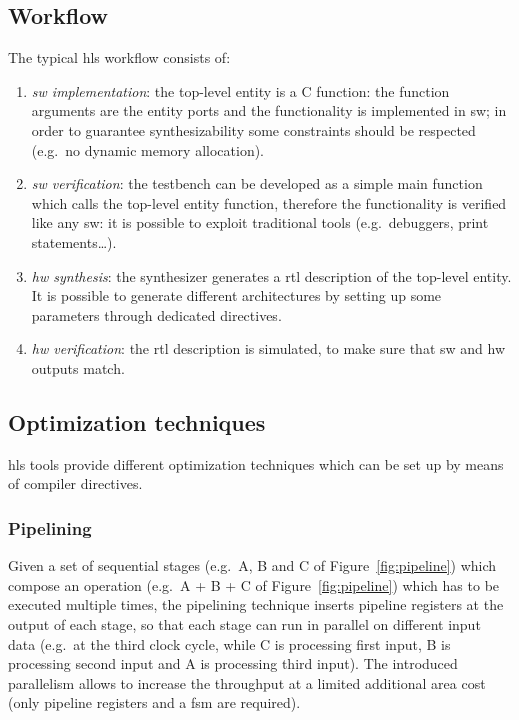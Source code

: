\documentclass[11pt,a4paper,oneside]{memoir}
\begin{document}
\subsection{Workflow}
The typical \ac{hls} workflow consists of:
\begin{enumerate}
	\item \emph{\ac{sw} implementation}: the top-level entity is a C
		function: the function arguments are the entity ports and the
		functionality is implemented in \ac{sw}; in order to guarantee
		synthesizability some constraints should be respected (e.g.\ no
		dynamic memory allocation).
	\item \emph{\ac{sw} verification}: the testbench can be developed as a
		simple main function which calls the top-level entity function,
		therefore the functionality is verified like any \ac{sw}: it is
		possible to exploit traditional tools (e.g.\ debuggers, print
		statements\ldots).
	\item \emph{\ac{hw} synthesis}: the synthesizer generates a \ac{rtl}
		description of the top-level entity. It is possible to generate
		different architectures by setting up some parameters through
		dedicated directives.
	\item \emph{\ac{hw} verification}: the \ac{rtl} description is
		simulated, to make sure that \ac{sw} and \ac{hw} outputs match.
\end{enumerate}

\subsection{Optimization techniques}
\ac{hls} tools provide different optimization techniques which can be set up by
means of compiler directives.
\subsubsection{Pipelining}
Given a set of sequential stages (e.g.\ A, B and C of Figure~\ref{fig:pipeline})
which compose an operation (e.g.\ A + B + C of Figure~\ref{fig:pipeline}) which
has to be executed multiple times, the pipelining technique inserts pipeline
registers at the output of each stage, so that each stage can run in parallel
on different input data (e.g.\ at the third clock cycle, while C is processing
first input, B is processing second input and A is processing third input).
The introduced parallelism allows to increase the throughput at a limited
additional area cost (only pipeline registers and a \acs{fsm} are required).
\end{document}
